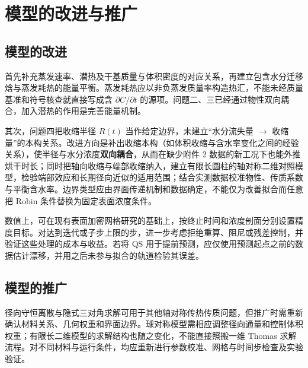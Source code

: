 \section{模型的改进与推广}

\subsection{模型的改进}
首先补充蒸发速率、潜热及干基质量与体积密度的对应关系，再建立包含水分迁移焓与蒸发耗热的能量平衡。蒸发耗热应以非负蒸发质量率构造热汇，不能未经质量基准和符号核查就直接写成含 $\partial C/\partial t$ 的源项。问题二、三已经通过物性双向耦合，加入潜热的作用是完善能量机制。

其次，问题四把收缩半径 $R(t)$ 当作给定边界，未建立“水分流失量 $\to$ 收缩量”的本构关系。改进方向是补出收缩本构（如体积收缩与含水率变化之间的经验关系），使半径与水分浓度\textbf{双向耦合}，从而在缺少附件 2 数据的新工况下也能外推烘干时长；同时把轴向收缩与端部收缩纳入，建立有限长圆柱的轴对称二维对照模型，检验端部效应和长期径向近似的适用范围；结合实测数据校准物性、传质系数与平衡含水率。边界类型应由界面传递机制和数据确定，不能仅为改善拟合而任意把 Robin 条件替换为固定表面浓度条件。

数值上，可在现有表面加密网格研究的基础上，按终止时间和浓度剖面分别设置精度目标。对达到迭代或子步上限的步，进一步考虑拒绝重算、阻尼或残差控制，并验证这些处理的成本与收益。若将 QS 用于提前预测，应仅使用预测起点之前的数据估计漂移，并用之后未参与拟合的轨道检验其误差。

\subsection{模型的推广}
径向守恒离散与隐式三对角求解可用于其他轴对称传热传质问题，但推广时需重新确认材料关系、几何权重和界面边界。球对称模型需相应调整径向通量和控制体积权重；有限长二维模型的求解结构也随之变化，不能直接照搬一维 Thomas 求解流程。对不同材料与运行条件，均应重新进行参数校准、网格与时间步检查及实验验证。
